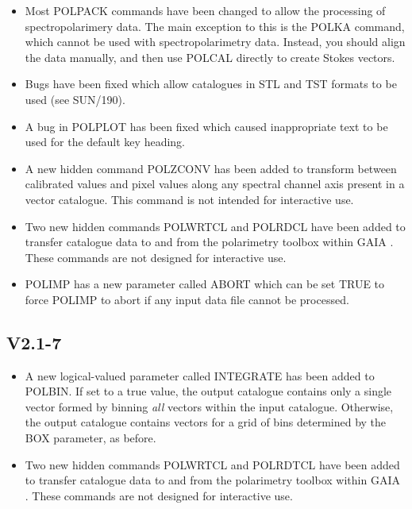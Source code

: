 \documentclass[twoside,11pt]{article}
\newcommand{\htmlref}[2]{#1}
\newcommand{\xref}[3]{#1}
\renewcommand{\_}{\texttt{\symbol{95}}}
\begin{document}
\begin{itemize}
\item Most POLPACK commands have been changed to allow the processing of
spectropolarimery data. The main exception to this is the POLKA command,
which cannot be used with spectropolarimetry data. Instead, you should
align the data manually, and then use POLCAL directly to create Stokes 
vectors.

\item Bugs have been fixed which allow catalogues in STL and TST formats 
to be used (see \xref{SUN/190}{sun190}{FORMAT}).

\item A bug in POLPLOT has been fixed which caused inappropriate
text to be used for the default key heading.

\item A new hidden command POLZCONV has been added to transform between 
calibrated values and pixel values along any spectral channel axis
present in a vector catalogue. This command is not intended for
interactive use.

\item Two new hidden commands POLWRTCL and POLRDCL have been added to 
transfer catalogue data to and from the polarimetry toolbox within
\xref{GAIA}{sun214}{} . These commands are not
designed for interactive use.

\item POLIMP has a new parameter called ABORT which can be set TRUE
to force POLIMP to abort if any input data file cannot be processed.

\end{itemize}

\subsection{V2.1-7}
\begin{itemize}

\item A new logical-valued parameter called INTEGRATE has been added to 
\htmlref{POLBIN}{POLBIN}. If set to a true value, the output catalogue
contains only a single vector formed by binning \emph{all} vectors
within the input catalogue. Otherwise, the output catalogue contains 
vectors for a grid of bins determined by the BOX parameter, as before.

\item Two new hidden commands POLWRTCL and POLRDTCL have been added to 
transfer catalogue data to and from the polarimetry toolbox within
\xref{GAIA}{sun214}{} . These commands are not
designed for interactive use.
\end{itemize}
\end{document}
